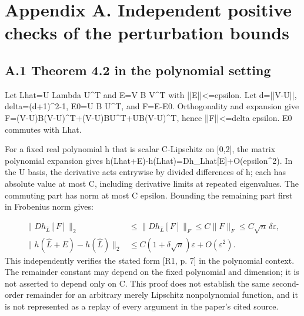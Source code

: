 \documentclass[10pt]{article}
\begin{document}
\section*{Appendix A. Independent positive checks of the perturbation bounds}
\subsection*{A.1 Theorem 4.2 in the polynomial setting}
Let Lhat=U Lambda U\textasciicircum{}T and E=V B V\textasciicircum{}T with ||E||<=epsilon. Let d=||V-U||, delta=(d+1)\textasciicircum{}2-1, E0=U B U\textasciicircum{}T, and F=E-E0. Orthogonality and expansion give F=(V-U)B(V-U)\textasciicircum{}T+(V-U)BU\textasciicircum{}T+UB(V-U)\textasciicircum{}T, hence ||F||<=delta epsilon. E0 commutes with Lhat.\par
For a fixed real polynomial h that is scalar C-Lipschitz on [0,2], the matrix polynomial expansion gives h(Lhat+E)-h(Lhat)=Dh\_Lhat[E]+O(epsilon\textasciicircum{}2). In the U basis, the derivative acts entrywise by divided differences of h; each has absolute value at most C, including derivative limits at repeated eigenvalues. The commuting part has norm at most C epsilon. Bounding the remaining part first in Frobenius norm gives:\par
\[\begin{aligned}
\|Dh_{\widehat L}[F]\|_2&\le\|Dh_{\widehat L}[F]\|_F\le C\|F\|_F\le C\sqrt n\,\delta\varepsilon,\\
\|h(\widehat L+E)-h(\widehat L)\|_2&\le C(1+\delta\sqrt n)\varepsilon+O(\varepsilon^2).
\end{aligned}\] This independently verifies the stated form [R1, p. 7] in the polynomial context. The remainder constant may depend on the fixed polynomial and dimension; it is not asserted to depend only on C. This proof does not establish the same second-order remainder for an arbitrary merely Lipschitz nonpolynomial function, and it is not represented as a replay of every argument in the paper’s cited source.\par
\end{document}
